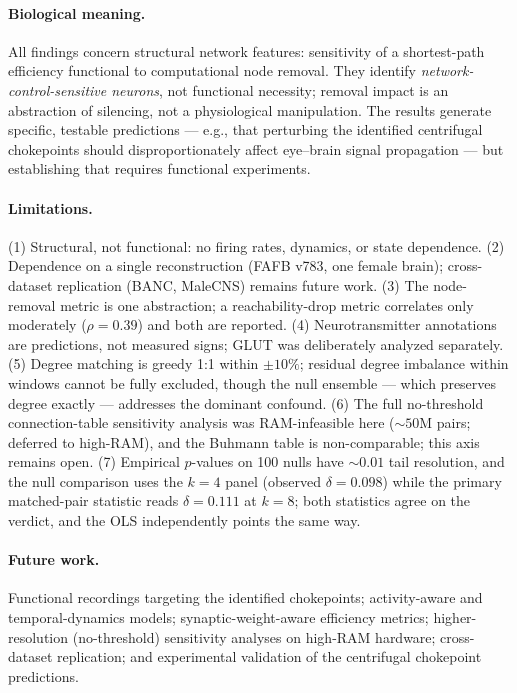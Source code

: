 \paragraph{Biological meaning.}
All findings concern structural network features: sensitivity of a
shortest-path efficiency functional to computational node removal. They
identify \emph{network-control-sensitive neurons}, not functional
necessity; removal impact is an abstraction of silencing, not a
physiological manipulation. The results generate specific, testable
predictions --- e.g., that perturbing the identified centrifugal
chokepoints should disproportionately affect eye--brain signal
propagation --- but establishing that requires functional experiments.

\paragraph{Limitations.}
(1) Structural, not functional: no firing rates, dynamics, or state
dependence. (2) Dependence on a single reconstruction (FAFB v783, one
female brain); cross-dataset replication (BANC, MaleCNS) remains future
work. (3) The node-removal metric is one abstraction; a reachability-drop
metric correlates only moderately ($\rho=0.39$) and both are reported.
(4) Neurotransmitter annotations are predictions, not measured signs;
GLUT was deliberately analyzed separately. (5) Degree matching is greedy
1:1 within $\pm10\%$; residual degree imbalance within windows cannot be
fully excluded, though the null ensemble --- which preserves degree
exactly --- addresses the dominant confound. (6) The full no-threshold
connection-table sensitivity analysis was RAM-infeasible here
(${\sim}50$M pairs; deferred to high-RAM), and the Buhmann table is
non-comparable; this axis remains open. (7) Empirical $p$-values on 100
nulls have ${\sim}0.01$ tail resolution, and the null comparison uses the
$k{=}4$ panel (observed $\delta=0.098$) while the primary matched-pair
statistic reads $\delta=0.111$ at $k{=}8$; both statistics agree on the
verdict, and the OLS independently points the same way.

\paragraph{Future work.}
Functional recordings targeting the identified chokepoints; activity-aware
and temporal-dynamics models; synaptic-weight-aware efficiency metrics;
higher-resolution (no-threshold) sensitivity analyses on high-RAM
hardware; cross-dataset replication; and experimental validation of the
centrifugal chokepoint predictions.
